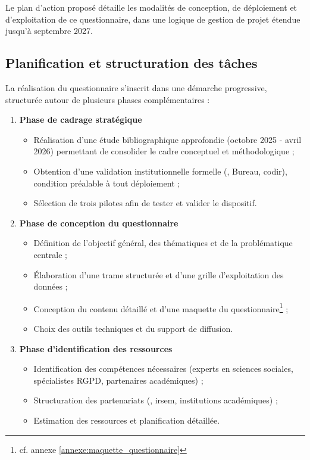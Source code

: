 Le plan d'action proposé détaille les modalités de conception, de déploiement et d'exploitation de ce questionnaire, dans une logique de gestion de projet étendue jusqu'à septembre 2027.

\subsection{Planification et structuration des tâches}

La réalisation du questionnaire s'inscrit dans une démarche progressive, structurée autour de plusieurs phases complémentaires :

\begin{enumerate}
    \item \textbf{Phase de cadrage stratégique}
    \begin{itemize}
        \item Réalisation d'une étude bibliographique approfondie (octobre 2025 - avril 2026) permettant de consolider le cadre conceptuel et méthodologique ;
        \item Obtention d'une validation institutionnelle formelle (\UnionIHEDN, Bureau, \acrshort{codir}), condition préalable à tout déploiement ;
        \item Sélection de trois \AssociationsRegionalesIHEDN{} pilotes afin de tester et valider le dispositif.
    \end{itemize}

    \item \textbf{Phase de conception du questionnaire}
    \begin{itemize}
        \item Définition de l'objectif général, des thématiques et de la problématique centrale ;
        \item Élaboration d'une trame structurée et d'une grille d'exploitation des données ;
        \item Conception du contenu détaillé et d'une maquette du questionnaire\footnote{cf. annexe \ref{annexe:maquette_questionnaire}} ;
        \item Choix des outils techniques et du support de diffusion.
    \end{itemize}

    \item \textbf{Phase d'identification des ressources}
    \begin{itemize}
        \item Identification des compétences nécessaires (experts en sciences sociales, spécialistes RGPD, partenaires académiques) ;
        \item Structuration des partenariats (\UnionIHEDN, \gls{irsem}, institutions académiques) ;
        \item Estimation des ressources et planification détaillée.
    \end{itemize}


\end{enumerate}
